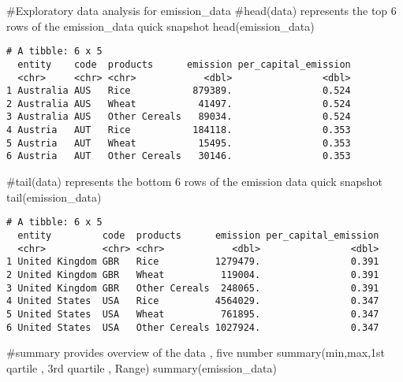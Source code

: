\documentclass[
  letterpaper,
  DIV=11,
  numbers=noendperiod]{scrartcl}
\newenvironment{Shaded}{\begin{snugshade}}{\end{snugshade}}
\newcommand{\CommentTok}[1]{\textcolor[rgb]{0.37,0.37,0.37}{#1}}
\newcommand{\FunctionTok}[1]{\textcolor[rgb]{0.28,0.35,0.67}{#1}}
\newcommand{\NormalTok}[1]{\textcolor[rgb]{0.00,0.23,0.31}{#1}}
\begin{document}
\begin{Shaded}
\begin{Highlighting}[]
\CommentTok{\#Exploratory data analysis for emission\_data}
\CommentTok{\#head(data) represents the top 6 rows of the emission\_data quick snapshot}
\FunctionTok{head}\NormalTok{(emission\_data)}
\end{Highlighting}
\end{Shaded}

\begin{verbatim}
# A tibble: 6 x 5
  entity    code  products      emission per_capital_emission
  <chr>     <chr> <chr>            <dbl>                <dbl>
1 Australia AUS   Rice           879389.                0.524
2 Australia AUS   Wheat           41497.                0.524
3 Australia AUS   Other Cereals   89034.                0.524
4 Austria   AUT   Rice           184118.                0.353
5 Austria   AUT   Wheat           15495.                0.353
6 Austria   AUT   Other Cereals   30146.                0.353
\end{verbatim}

\begin{Shaded}
\begin{Highlighting}[]
\CommentTok{\#tail(data) represents the bottom 6 rows of the emission data quick snapshot}
\FunctionTok{tail}\NormalTok{(emission\_data)}
\end{Highlighting}
\end{Shaded}

\begin{verbatim}
# A tibble: 6 x 5
  entity         code  products      emission per_capital_emission
  <chr>          <chr> <chr>            <dbl>                <dbl>
1 United Kingdom GBR   Rice          1279479.                0.391
2 United Kingdom GBR   Wheat          119004.                0.391
3 United Kingdom GBR   Other Cereals  248065.                0.391
4 United States  USA   Rice          4564029.                0.347
5 United States  USA   Wheat          761895.                0.347
6 United States  USA   Other Cereals 1027924.                0.347
\end{verbatim}

\begin{Shaded}
\begin{Highlighting}[]
\CommentTok{\#summary provides overview of the data , five number summary(min,max,1st qartile , 3rd quartile , Range) }
\FunctionTok{summary}\NormalTok{(emission\_data)}
\end{Highlighting}
\end{Shaded}
\end{document}
